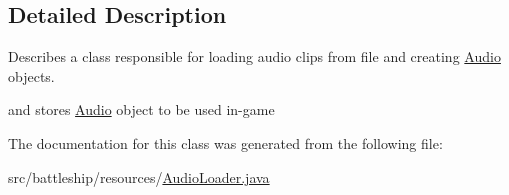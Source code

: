 \subsection{Detailed Description}
Describes a class responsible for loading audio clips from file and creating \hyperlink{classbattleship_1_1resources_1_1Audio}{Audio} objects. 

and stores \hyperlink{classbattleship_1_1resources_1_1Audio}{Audio} object to be used in-\/game 

The documentation for this class was generated from the following file\+:\begin{DoxyCompactItemize}
\item 
src/battleship/resources/\hyperlink{AudioLoader_8java}{Audio\+Loader.\+java}\end{DoxyCompactItemize}
